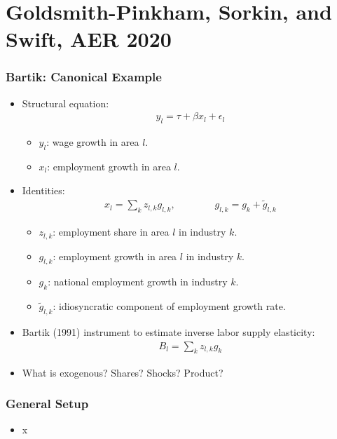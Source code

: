 \documentclass[english,xcolor=svgnames]{beamer}
\begin{document}
\section{Goldsmith-Pinkham, Sorkin, and Swift, AER 2020}

\begin{frame}
\frametitle[alignment=center]{Bartik: Canonical Example}
\begin{itemize}
	\item Structural equation:
	\begin{align*}
		y_l = \tau +\beta x_l + \epsilon_l
	\end{align*}
	\begin{itemize}
		\item $y_l$: wage growth in area $l$.
		\item $x_l$: employment growth in area $l$.
	\end{itemize}
	\item Identities:
	\begin{align*}
		x_l = \sum_k z_{l,k} g_{l,k}, \qquad\qquad g_{l,k} = g_k + \tilde{g}_{l,k}
	\end{align*}
	\begin{itemize}
		\item $z_{l,k}$: employment share in area $l$ in industry $k$.
		\item $g_{l,k}$: employment growth in area $l$ in industry $k$.
		\item $g_{k}$: national employment growth in industry $k$.
		\item $\tilde{g}_{l,k}$:  idiosyncratic component of employment growth rate.
	\end{itemize}
	\item Bartik (1991) instrument to estimate inverse labor supply elasticity:
	\begin{align*}
		B_l = \sum_k z_{l,k}g_k
	\end{align*}
	\item What is exogenous? Shares? Shocks? Product?
\end{itemize}
\end{frame}

\begin{frame}
\frametitle[alignment=center]{General Setup}
\begin{itemize}
	\item x
\end{itemize}
\end{frame}
\end{document}
